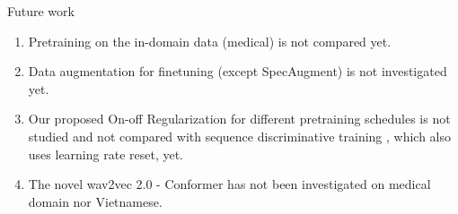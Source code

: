 \begin{frame}{Future work}
\begin{enumerate}
    \item Pretraining on the in-domain data (medical) is not compared yet.
    \item Data augmentation for finetuning (except SpecAugment) is not investigated yet.
    \item Our proposed On-off Regularization for different pretraining schedules is not studied and not compared with sequence discriminative training \cite{gibson2006hypothesis}, which also uses learning rate reset, yet.
    \item The novel wav2vec 2.0 - Conformer \cite{wav2vec2_conformer} has not been investigated on medical domain nor Vietnamese.
\end{enumerate}
    
\end{frame}